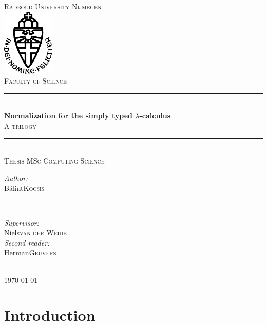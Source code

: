 \documentclass{report}
\title{\thesistitle}
\author{\thesisauthorfirst\space\thesisauthorsecond}
\date{\thesisdate}
\def\thesistitle{Normalization for the simply typed \texorpdfstring{$\lambda$}{lambda}-calculus}
\def\thesissubtitle{A trilogy}
\def\thesisauthorfirst{Bálint}
\def\thesisauthorsecond{Kocsis}
\def\thesissupervisorfirst{Niels}
\def\thesissupervisorsecond{van der Weide}
\def\thesissecondreaderfirst{Herman}
\def\thesissecondreadersecond{Geuvers}
\def\thesisdate{\today}
\begin{document}
\begin{titlepage}
	\thispagestyle{empty}
	\newcommand{\HRule}{\rule{\linewidth}{0.5mm}}
	\center
	\textsc{\Large Radboud University Nijmegen}\\[.7cm]
	\includegraphics[width=25mm]{img/in_dei_nomine_feliciter.eps}\\[.5cm]
	\textsc{Faculty of Science}\\[0.5cm]
	
	\HRule \\[0.4cm]
	{ \huge \bfseries \thesistitle}\\[0.1cm]
	\textsc{\thesissubtitle}\\
	\HRule \\[.5cm]
	\textsc{\large Thesis MSc Computing Science}\\[.5cm]
	
	\begin{minipage}{0.4\textwidth}
	\begin{flushleft} \large
	\emph{Author:}\\
	\thesisauthorfirst\space \textsc{\thesisauthorsecond}
	\end{flushleft}
	\end{minipage}
	~
	\begin{minipage}{0.4\textwidth}
	\begin{flushright} \large
	\emph{Supervisor:} \\
	\thesissupervisorfirst\space \textsc{\thesissupervisorsecond} \\[1em]
	\emph{Second reader:} \\
	\thesissecondreaderfirst\space \textsc{\thesissecondreadersecond}
	\end{flushright}
	\end{minipage}\\[4cm]
	\vfill
	{\large \thesisdate}\\
	\clearpage
\end{titlepage}

\tableofcontents

\chapter{Introduction} \label{chap:intro}

\end{document}
